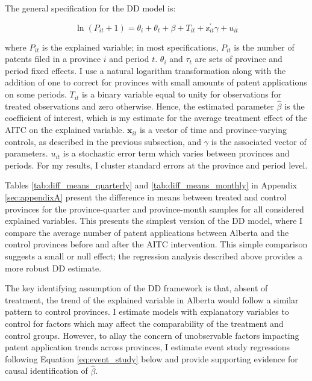 \documentclass[../main.tex]{subfiles}
\begin{document}
The general specification for the DD model is:

\begin{equation}
    \label{eq:dd_model}
    \ln(P_{it} + 1) = \theta_i + \theta_t + \beta + T_{it} + \mathbb{x}_{it}^{'} \gamma + u_{it}
\end{equation}

where $P_{it}$ is the explained variable; in most specifications, $P_{it}$ is the number of patents filed in a province $i$ and period $t$. $\theta_i$ and $\tau_t$ are sets of province and period fixed effects. I use a natural logarithm transformation along with the addition of one to correct for provinces with small amounts of patent applications on some periods. $T_{it}$ is a binary variable equal to unity for observations for treated observations and zero otherwise. Hence, the estimated parameter $\hat{\beta}$ is the coefficient of interest, which is my estimate for the average treatment effect of the AITC on the explained variable. $\mathbf{x}_{it}$ is a vector of time and province-varying controls, as described in the previous subsection, and $\gamma$ is the associated vector of parameters. $u_{it}$ is a stochastic error term which varies between provinces and periods. For my results, I cluster standard errors at the province and period level. 

Tables \ref{tab:diff_means_quarterly} and \ref{tab:diff_means_monthly} in Appendix \ref{sec:appendixA} present the difference in means between treated and control provinces for the province-quarter and province-month samples for all considered explained variables. This presents the simplest version of the DD model, where I compare the average number of patent applications between Alberta and the control provinces before and after the AITC intervention. This simple comparison suggests a small or null effect; the regression analysis described above provides a more robust DD estimate. 

The key identifying assumption of the DD framework is that, absent of treatment, the trend of the explained variable in Alberta would follow a similar pattern to control provinces. I estimate models with explanatory variables to control for factors which may affect the comparability of the treatment and control groups. However, to allay the concern of unobservable factors impacting patent application trends across provinces, I estimate event study regressions following Equation \ref{eq:event_study} below and provide supporting evidence for causal identification of $\hat{\beta}$.
\end{document}

